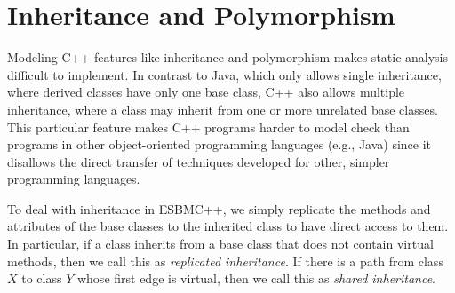 \documentclass[conference]{IEEEtran}
\newcommand{\comment}[1]{}
\begin{document}
\comment{
We have elaborated a hierarchical structure for the
input/output (I/O) stream library that is similar to the actual
one (as described in~\cite{CppReference12}). However,
in our I/O stream operational model, the input operator $>>$
is simply modeled as a non-deterministic variable and we do not check
any related safety property. Similarly, the output operator $<<$ does not
present any constraints or properties to be checked since
we do not check whether a given value has been printed on the screen
(ESBMC++ is only interested in checking the properties related to
software and not that of hardware).}




\section{Inheritance and Polymorphism}
\label{inheritance-and-polymorphism}

Modeling C++ features like inheritance and polymorphism
makes static analysis difficult to implement.
In contrast to Java, which only allows single inheritance, where derived classes
have only one base class, C++ also allows multiple inheritance, where a class
may inherit from one or more unrelated base classes. This particular feature
makes C++ programs harder to model check than programs in other object-oriented
programming languages (e.g., Java) since it disallows the direct transfer of
techniques developed for other, simpler programming languages.

To deal with inheritance in ESBMC++, we simply replicate the methods
and attributes of the base classes to the inherited class to have
direct access to them. In particular, if a class inherits from
a base class that does not contain virtual methods,
then we call this as \textit{replicated inheritance}. If there is a path from
class $\mathit{X}$ to class $\mathit{Y}$ whose first edge is virtual, then
we call this as \textit{shared inheritance}.
\end{document}
